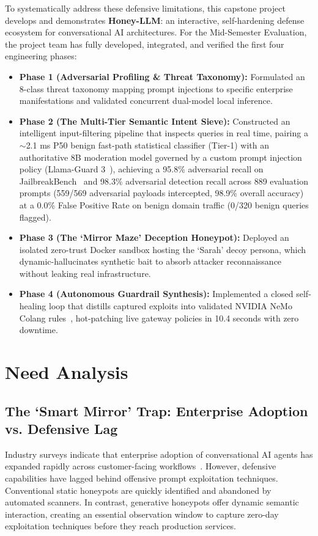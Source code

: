 \documentclass[12pt,a4paper,oneside]{report}
\begin{document}
To systematically address these defensive limitations, this capstone project develops and demonstrates \textbf{Honey-LLM}: an interactive, self-hardening defense ecosystem for conversational AI architectures. For the Mid-Semester Evaluation, the project team has fully developed, integrated, and verified the first four engineering phases:
\begin{itemize}
    \item \textbf{Phase 1 (Adversarial Profiling \& Threat Taxonomy):} Formulated an 8-class threat taxonomy mapping prompt injections to specific enterprise manifestations and validated concurrent dual-model local inference.
    \item \textbf{Phase 2 (The Multi-Tier Semantic Intent Sieve):} Constructed an intelligent input-filtering pipeline that inspects queries in real time, pairing a $\sim$2.1 ms P50 benign fast-path statistical classifier (Tier-1) with an authoritative 8B moderation model governed by a custom prompt injection policy (Llama-Guard 3~\cite{llamaguard3}), achieving a 95.8\% adversarial recall on JailbreakBench~\cite{jailbreakbench2024} and 98.3\% adversarial detection recall across 889 evaluation prompts (559/569 adversarial payloads intercepted, 98.9\% overall accuracy) at a 0.0\% False Positive Rate on benign domain traffic (0/320 benign queries flagged).
    \item \textbf{Phase 3 (The `Mirror Maze' Deception Honeypot):} Deployed an isolated zero-trust Docker sandbox hosting the `Sarah' decoy persona, which dynamic-hallucinates synthetic bait to absorb attacker reconnaissance without leaking real infrastructure.
    \item \textbf{Phase 4 (Autonomous Guardrail Synthesis):} Implemented a closed self-healing loop that distills captured exploits into validated NVIDIA NeMo Colang rules~\cite{nemo2024guardrails}, hot-patching live gateway policies in 10.4 seconds with zero downtime.
\end{itemize}

\section{Need Analysis}
\subsection{The `Smart Mirror' Trap: Enterprise Adoption vs. Defensive Lag}
Industry surveys indicate that enterprise adoption of conversational AI agents has expanded rapidly across customer-facing workflows~\cite{openai2023gpt4}. However, defensive capabilities have lagged behind offensive prompt exploitation techniques. Conventional static honeypots are quickly identified and abandoned by automated scanners. In contrast, generative honeypots offer dynamic semantic interaction, creating an essential observation window to capture zero-day exploitation techniques before they reach production services.
\end{document}
